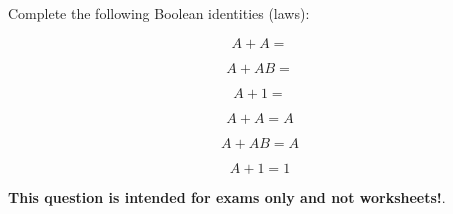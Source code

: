 

Complete the following Boolean identities (laws):

$$A + A = $$

$$A + AB = $$

$$A + 1 = $$







$$A + A = A$$

$$A + AB = A$$

$$A + 1 = 1$$







{\bf This question is intended for exams only and not worksheets!}.




